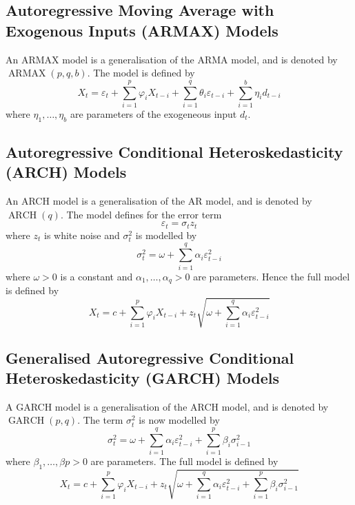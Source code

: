 \documentclass[11pt]{report} %
\begin{document}
\subsection{Autoregressive Moving Average with Exogenous Inputs (ARMAX) Models}
An ARMAX model is a generalisation of the ARMA model, and is denoted by $\operatorname{ARMAX}\left(p, q, b\right)$. The model is defined by
\begin{equation}
X_{t} = \varepsilon_{t} + \sum_{i = 1}^{p}\varphi_{i}X_{t - i} + \sum_{i = 1}^{q}\theta_{i}\varepsilon_{t - i} + \sum_{i = 1}^{b}\eta_{i}d_{t - i}
\end{equation}
where $\eta_{1}, \dots, \eta_{b}$ are parameters of the exogeneous input $d_{t}$.

\subsection{Autoregressive Conditional Heteroskedasticity (ARCH) Models}
An ARCH model is a generalisation of the AR model, and is denoted by $\operatorname{ARCH}\left(q\right)$. The model defines for the error term
\begin{equation}
\varepsilon_{t} = \sigma_{t}z_{t}
\end{equation}
where $z_{t}$ is white noise and $\sigma^{2}_{t}$ is modelled by
\begin{equation}
\sigma^{2}_{t} = \omega + \sum_{i = 1}^{q}\alpha_{i}\varepsilon^{2}_{t - i}
\end{equation}
where $\omega > 0$ is a constant and $\alpha_{1}, \dots, \alpha_{q} > 0$ are parameters. Hence the full model is defined by
\begin{equation}
X_{t} = c + \sum_{i = 1}^{p}\varphi_{i}X_{t - i} + z_{t}\sqrt{\omega + \sum_{i = 1}^{q}\alpha_{i}\varepsilon^{2}_{t - i}}
\end{equation}

\subsection{Generalised Autoregressive Conditional Heteroskedasticity (GARCH) Models}
A GARCH model is a generalisation of the ARCH model, and is denoted by $\operatorname{GARCH}\left(p, q\right)$. The term $\sigma^{2}_{t}$ is now modelled by
\begin{equation}
\sigma^{2}_{t} = \omega + \sum_{i = 1}^{q}\alpha_{i}\varepsilon^{2}_{t - i} + \sum_{i = 1}^{p}\beta_{i}\sigma^{2}_{i - 1}
\end{equation}
where $\beta_{1}, \dots, \beta{p} > 0$ are parameters. The full model is defined by
\begin{equation}
X_{t} = c + \sum_{i = 1}^{p}\varphi_{i}X_{t - i} + z_{t}\sqrt{\omega + \sum_{i = 1}^{q}\alpha_{i}\varepsilon^{2}_{t - i} + \sum_{i = 1}^{p}\beta_{i}\sigma^{2}_{i - 1}}
\end{equation}
\end{document}
